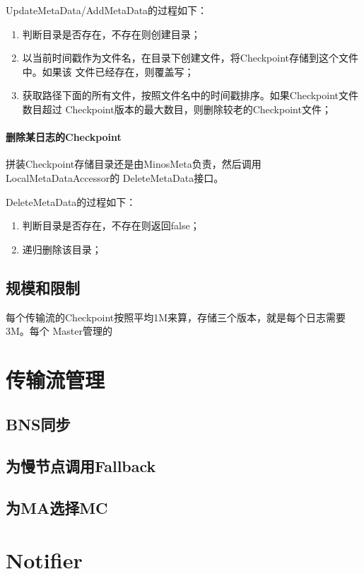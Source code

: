 \documentclass[11pt]{article}
\begin{document}
UpdateMetaData/AddMetaData的过程如下：
\begin{enumerate}
\item 判断目录是否存在，不存在则创建目录；
\item 以当前时间戳作为文件名，在目录下创建文件，将Checkpoint存储到这个文件中。如果该
文件已经存在，则覆盖写；
\item 获取路径下面的所有文件，按照文件名中的时间戳排序。如果Checkpoint文件数目超过
Checkpoint版本的最大数目，则删除较老的Checkpoint文件；
\end{enumerate}
\paragraph{删除某日志的Checkpoint}
\label{sec-2-2-1-4}
拼装Checkpoint存储目录还是由MinosMeta负责，然后调用LocalMetaDataAccessor的
DeleteMetaData接口。

DeleteMetaData的过程如下：
\begin{enumerate}
\item 判断目录是否存在，不存在则返回false；
\item 递归删除该目录；
\end{enumerate}

\subsection{规模和限制}
\label{sec-2-3}
每个传输流的Checkpoint按照平均1M来算，存储三个版本，就是每个日志需要3M。每个
Master管理的

\section{传输流管理}
\label{sec-3}
\subsection{BNS同步}
\label{sec-3-1}
\subsection{为慢节点调用Fallback}
\label{sec-3-2}
\subsection{为MA选择MC}
\label{sec-3-3}

\section{Notifier}
\label{sec-4}
\end{document}
